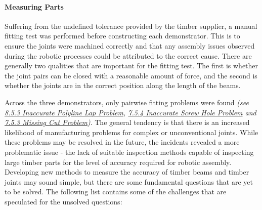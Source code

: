 \documentclass[11pt]{book}
\begin{document}
\paragraph{Measuring Parts}

Suffering from the undefined tolerance provided by the timber supplier, a manual fitting test was performed before constructing each demonstrator. This is to ensure the joints were machined correctly and that any assembly issues observed during the robotic processes could be attributed to the correct cause. There are generally two qualities that are important for the fitting test. The first is whether the joint pairs can be closed with a reasonable amount of force, and the second is whether the joints are in the correct position along the length of the beams.

Across the three demonstrators, only pairwise fitting problems were found \textit{(see \uline{8.5.3 Inaccurate Polyline Lap Problem}, \uline{7.5.4 Inaccurate Screw Hole Problem} and \uline{7.5.3 Missing Cut Problem})}. The general tendency is that there is an increased likelihood of manufacturing problems for complex or unconventional joints. While these problems may be resolved in the future, the incidents revealed a more problematic issue - the lack of suitable inspection methods capable of inspecting large timber parts for the level of accuracy required for robotic assembly. Developing new methods to measure the accuracy of timber beams and timber joints may sound simple, but there are some fundamental questions that are yet to be solved. The following list contains some of the challenges that are speculated for the unsolved questions: 
\end{document}
